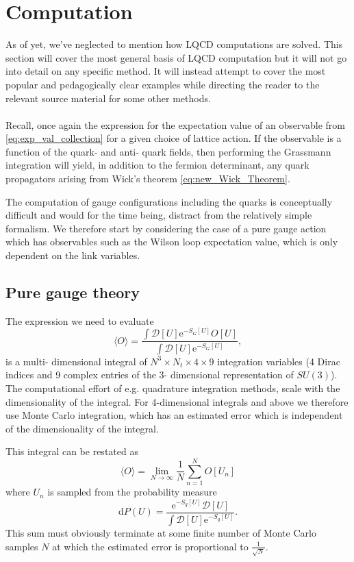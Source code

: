\documentclass[a4paper,10pt]{article}
\begin{document}
\section{Computation}
As of yet, we've neglected to mention how LQCD computations are solved. This section will cover the most general basis of LQCD computation but it will not go into detail on any specific method. It will instead attempt to cover the most popular and pedagogically clear examples while directing the reader to the relevant source material for some other methods.\\\\Recall, once again the expression for the expectation value of an observable from \eqref{eq:exp_val_collection} for a given choice of lattice action. If the observable is a function of the quark- and anti- quark fields, then performing the Grassmann integration will yield, in addition to the fermion determinant, any quark propagators arising from Wick's theorem \eqref{eq:new_Wick_Theorem}. \par The computation of gauge configurations including the quarks is conceptually difficult and would for the time being, distract from the relatively simple formalism. We therefore start by considering the case of a pure gauge action which has observables such as the Wilson loop expectation value, which is only dependent on the link variables.
\subsection{Pure gauge theory}
The expression we need to evaluate 
\begin{equation}
\langle O\rangle=\frac{\int \mathcal{D}[U] \mathrm{e}^{-S_{G}[U]} O[U]}{\int \mathcal{D}[U] \mathrm{e}^{-S_{G}[U]}}  ,
\end{equation}
is a multi- dimensional integral of $N^3\times N_t \times 4 \times 9$ integration variables (4 Dirac indices and 9 complex entries of the 3- dimensional representation of $SU(3)$). The computational effort of e.g. quadrature integration methods, scale with the dimensionality of the integral. For 4-dimensional integrals and above we therefore use Monte Carlo integration, which has an estimated error which is independent of the dimensionality of the integral.

This integral can be restated as 
\begin{equation}\label{eq:MC_gauge_sum}
\langle O\rangle=\lim _{N \rightarrow \infty} \frac{1}{N} \sum_{n=1}^{N} O\left[U_{n}\right]
\end{equation}
where $U_{n}$ is sampled from the probability measure
\begin{equation}\label{eq:prob_measure}
\mathrm{d} P(U)=\frac{\mathrm{e}^{-S_g[U]} \mathcal{D}[U]}{\int \mathcal{D}[U] \mathrm{e}^{-S_g[U]}}.
\end{equation}
This sum must obviously terminate at some finite number of Monte Carlo samples $N$ at which the estimated error is proportional to $\frac{1}{\sqrt{N}}$.
\end{document}
